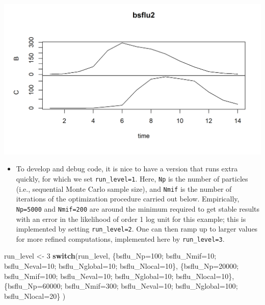 \documentclass[]{article}
\newenvironment{Shaded}{\begin{snugshade}}{\end{snugshade}}
\newcommand{\DecValTok}[1]{\textcolor[rgb]{0.00,0.00,0.81}{#1}}
\newcommand{\StringTok}[1]{\textcolor[rgb]{0.31,0.60,0.02}{#1}}
\newcommand{\ControlFlowTok}[1]{\textcolor[rgb]{0.13,0.29,0.53}{\textbf{#1}}}
\newcommand{\NormalTok}[1]{#1}
\providecommand{\tightlist}{%
  \setlength{\itemsep}{0pt}\setlength{\parskip}{0pt}}
\begin{document}
\begin{center}\includegraphics{figure/notes12-pomp_bsflu-1} \end{center}

\begin{itemize}
\tightlist
\item
  To develop and debug code, it is nice to have a version that runs
  extra quickly, for which we set \texttt{run\_level=1}. Here,
  \texttt{Np} is the number of particles (i.e., sequential Monte Carlo
  sample size), and \texttt{Nmif} is the number of iterations of the
  optimization procedure carried out below. Empirically,
  \texttt{Np=5000} and \texttt{Nmif=200} are around the minimum required
  to get stable results with an error in the likelihood of order 1 log
  unit for this example; this is implemented by setting
  \texttt{run\_level=2}. One can then ramp up to larger values for more
  refined computations, implemented here by \texttt{run\_level=3}.
\end{itemize}

\begin{Shaded}
\begin{Highlighting}[]
\NormalTok{run_level <-}\StringTok{ }\DecValTok{3}
\ControlFlowTok{switch}\NormalTok{(run_level,}
\NormalTok{       \{bsflu_Np=}\DecValTok{100}\NormalTok{; bsflu_Nmif=}\DecValTok{10}\NormalTok{; bsflu_Neval=}\DecValTok{10}\NormalTok{; bsflu_Nglobal=}\DecValTok{10}\NormalTok{; bsflu_Nlocal=}\DecValTok{10}\NormalTok{\}, }
\NormalTok{       \{bsflu_Np=}\DecValTok{20000}\NormalTok{; bsflu_Nmif=}\DecValTok{100}\NormalTok{; bsflu_Neval=}\DecValTok{10}\NormalTok{; bsflu_Nglobal=}\DecValTok{10}\NormalTok{; bsflu_Nlocal=}\DecValTok{10}\NormalTok{\}, }
\NormalTok{       \{bsflu_Np=}\DecValTok{60000}\NormalTok{; bsflu_Nmif=}\DecValTok{300}\NormalTok{; bsflu_Neval=}\DecValTok{10}\NormalTok{; bsflu_Nglobal=}\DecValTok{100}\NormalTok{; bsflu_Nlocal=}\DecValTok{20}\NormalTok{\}}
\NormalTok{)}
\end{Highlighting}
\end{Shaded}
\end{document}
